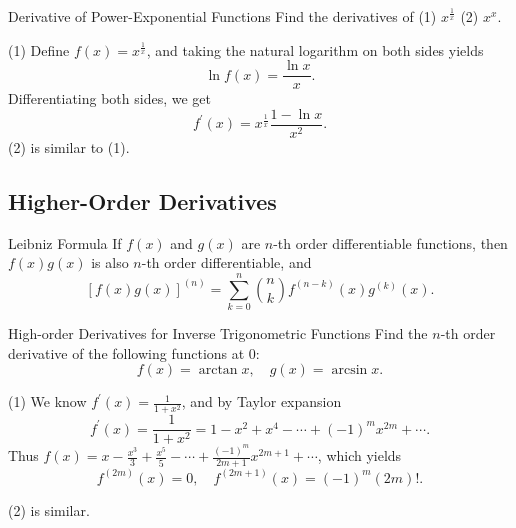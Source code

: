 \begin{example}{Derivative of Power-Exponential Functions}{}
  Find the derivatives of (1) $x^{\frac{1}{x}}$
  (2) $x^x$.
\end{example}

\begin{solution}
  (1) Define $f(x) = x^{\frac{1}{x}}$, and
  taking the natural logarithm on both sides yields
  \begin{equation}
    \ln f(x) = \frac{\ln x}{x}.
  \end{equation}
  Differentiating both sides, we get
  \begin{equation}
    f^{\prime}(x) = x^{\frac{1}{x}} \frac{1 - \ln x}{x^2}.
  \end{equation}
  (2) is similar to (1).
\end{solution}

\subsection{Higher-Order Derivatives}

\begin{proposition}{Leibniz Formula}{}
  If $f(x)$ and $g(x)$ are $n$-th order differentiable functions,
  then $f(x)g(x)$ is also $n$-th order differentiable, and
  \begin{equation}
    \left[ f(x)g(x) \right]^{(n)} = \sum\limits_{k = 0}^n \binom{n}{k} f^{(n-k)}(x) g^{(k)}(x).
  \end{equation}
\end{proposition}

\begin{example}{High-order Derivatives for Inverse Trigonometric Functions}{}
  Find the $n$-th order derivative of the following functions at $0$:
  \begin{equation}
    f(x) = \arctan x, \quad
    g(x) = \arcsin x.
  \end{equation}
\end{example}

\begin{solution}
  (1) We know $f^{\prime}(x) = \frac{1}{1+x^2}$, and by Taylor expansion
  \begin{equation}
    f^{\prime}(x) = \frac{1}{1+x^2} = 1 - x^2 + x^4 - \cdots + (-1)^mx^{2m} + \cdots.
  \end{equation}
  Thus $f(x) = x - \frac{x^3}{3} + \frac{x^5}{5} - \cdots +
  \frac{(-1)^m}{2m+1}x^{2m+1} + \cdots$,
  which yields
  \begin{equation}
    f^{(2m)}(x) = 0, \quad f^{(2m+1)}(x) = (-1)^m (2m)!.
  \end{equation}

  (2) is similar.
\end{solution}

